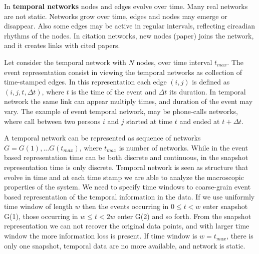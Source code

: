 In \textbf{temporal networks} nodes and edges evolve over time. Many real networks are not static. Networks grow over time, edges and nodes may emerge or disappear. Also some edges may be active in regular intervals, reflecting circadian rhythms of the nodes. In citation networks, new nodes (paper) joins the network, and it creates links with cited papers. 

Let consider the temporal network with $N$ nodes, over time interval $t_{max}$. The event representation consist in viewing the temporal networks as collection of time-stamped edges. In this representation each edge $(i, j)$ is defined as$(i, j, t, \Delta t)$, where $t$ is the time of the event and $\Delta t$ its duration. In temporal network the same link can appear multiply times, and duration of the event may vary. The example of event temporal network, may be phone-calls networks, where  call between two persons $i$ and $j$ started at time $t$ and ended at $t + \Delta t$. 


A temporal network can be represented as sequence of networks $G= G(1), ... G(t_{max})$, where $t_{max}$ is number of networks. While in the event based representation time can be both discrete and continuous, in the snapshot representation time is only discrete. Temporal network is seen as structure that evolve in time and at each time stamp we are able to analyze the macroscopic properties of the system. We need to specify time windows to coarse-grain event based representation of the temporal information in the data. If we use uniformly time window of length $w$ then the events occurring in $0 \leq t < w$ enter snapshot G(1), those occurring in $w \leq t < 2w$ enter G(2) and so forth. From the snapshot representation we can not recover the original data points, and with larger time window the more information loss is present. If time window is $w=t_{max}$, there is only one snapshot, temporal data are no more available, and network is static.


